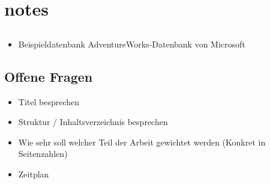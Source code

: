 \chapter{notes}
\section{}
\begin{itemize}
\item Beispieldatenbank AdventureWorks-Datenbank von Microsoft
\end{itemize}


\section{Offene Fragen}
\begin{itemize}
  \item Titel besprechen
  \item Struktur / Inhaltsverzeichnis besprechen
  \item Wie sehr soll welcher Teil der Arbeit gewichtet werden (Konkret in Seitenzahlen)
  \item Zeitplan
\end{itemize}
